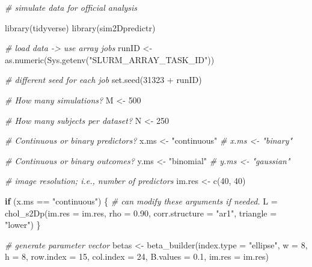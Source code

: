 \documentclass[
]{article}
\newenvironment{Shaded}{\begin{snugshade}}{\end{snugshade}}
\newcommand{\AttributeTok}[1]{\textcolor[rgb]{0.77,0.63,0.00}{#1}}
\newcommand{\CommentTok}[1]{\textcolor[rgb]{0.56,0.35,0.01}{\textit{#1}}}
\newcommand{\ControlFlowTok}[1]{\textcolor[rgb]{0.13,0.29,0.53}{\textbf{#1}}}
\newcommand{\DecValTok}[1]{\textcolor[rgb]{0.00,0.00,0.81}{#1}}
\newcommand{\FloatTok}[1]{\textcolor[rgb]{0.00,0.00,0.81}{#1}}
\newcommand{\FunctionTok}[1]{\textcolor[rgb]{0.00,0.00,0.00}{#1}}
\newcommand{\NormalTok}[1]{#1}
\newcommand{\OtherTok}[1]{\textcolor[rgb]{0.56,0.35,0.01}{#1}}
\newcommand{\SpecialCharTok}[1]{\textcolor[rgb]{0.00,0.00,0.00}{#1}}
\newcommand{\StringTok}[1]{\textcolor[rgb]{0.31,0.60,0.02}{#1}}
\begin{document}
\begin{Shaded}
\begin{Highlighting}[]
\CommentTok{\# simulate data for official analysis}

\FunctionTok{library}\NormalTok{(tidyverse)}
\FunctionTok{library}\NormalTok{(sim2Dpredictr)}

\CommentTok{\# load data {-}\textgreater{} use array jobs}
\NormalTok{runID }\OtherTok{\textless{}{-}} \FunctionTok{as.numeric}\NormalTok{(}\FunctionTok{Sys.getenv}\NormalTok{(}\StringTok{"SLURM\_ARRAY\_TASK\_ID"}\NormalTok{))}

\CommentTok{\# different seed for each job}
\FunctionTok{set.seed}\NormalTok{(}\DecValTok{31323} \SpecialCharTok{+}\NormalTok{ runID)}

\CommentTok{\# How many simulations?}
\NormalTok{M }\OtherTok{\textless{}{-}} \DecValTok{500}

\CommentTok{\# How many subjects per dataset?}
\NormalTok{N }\OtherTok{\textless{}{-}} \DecValTok{250}

\CommentTok{\# Continuous or binary predictors?}
\NormalTok{x.ms }\OtherTok{\textless{}{-}} \StringTok{"continuous"}
\CommentTok{\# x.ms \textless{}{-} "binary"}

\CommentTok{\# Continuous or binary outcomes?}
\NormalTok{y.ms }\OtherTok{\textless{}{-}} \StringTok{"binomial"}
\CommentTok{\# y.ms \textless{}{-} "gaussian"}

\CommentTok{\# image resolution; i.e., number of predictors}
\NormalTok{im.res }\OtherTok{\textless{}{-}} \FunctionTok{c}\NormalTok{(}\DecValTok{40}\NormalTok{, }\DecValTok{40}\NormalTok{)}

\ControlFlowTok{if}\NormalTok{ (x.ms }\SpecialCharTok{==} \StringTok{"continuous"}\NormalTok{) \{}
  \CommentTok{\# can modify these arguments if needed.}
\NormalTok{  L }\OtherTok{=} \FunctionTok{chol\_s2Dp}\NormalTok{(}\AttributeTok{im.res =}\NormalTok{ im.res, }\AttributeTok{rho =} \FloatTok{0.90}\NormalTok{,}
                \AttributeTok{corr.structure =} \StringTok{"ar1"}\NormalTok{,}
                \AttributeTok{triangle =} \StringTok{"lower"}\NormalTok{)}
\NormalTok{\}}

\CommentTok{\# generate parameter vector}
\NormalTok{betas }\OtherTok{\textless{}{-}} \FunctionTok{beta\_builder}\NormalTok{(}\AttributeTok{index.type =} \StringTok{"ellipse"}\NormalTok{,}
                      \AttributeTok{w =} \DecValTok{8}\NormalTok{, }\AttributeTok{h =} \DecValTok{8}\NormalTok{,}
                      \AttributeTok{row.index =} \DecValTok{15}\NormalTok{, }\AttributeTok{col.index =} \DecValTok{24}\NormalTok{,}
                      \AttributeTok{B.values =} \FloatTok{0.1}\NormalTok{, }\AttributeTok{im.res =}\NormalTok{ im.res)}


\end{Highlighting}
\end{Shaded}
\end{document}
